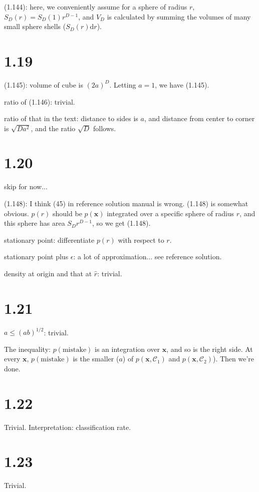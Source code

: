 \documentclass[12pt]{article}
\newcommand{\vect}[1]{\mathbf{#1}}
\begin{document}
(1.144): here, we conveniently assume for a sphere of radius $r$, $S_D(r) =S_D(1) r^{D-1} $, and $V_D$ is calculated by summing the volumes of many small sphere shells ($S_D(r) \mathrm{d}r$).

\section{1.19}
(1.145): volume of cube is $(2a)^D$. Letting $a=1$, we have (1.145).

ratio of (1.146): trivial.

ratio of that in the text: distance to sides is $a$, and distance from center to corner is $\sqrt{D a^2}$, and the ratio $\sqrt{D}$ follows.

\section{1.20}
skip for now...

(1.148): I think (45) in reference solution manual is wrong. (1.148) is somewhat obvious. $p(r)$ should be $p(\vect{x})$ integrated over a specific sphere of radius $r$, and this sphere has area $S_D r^{D-1}$, so we get (1.148).

stationary point: differentiate $p(r)$ with respect to $r$.

stationary point plus $\epsilon$: a lot of approximation... see reference solution.

density at origin and that at $\widehat{r}$: trivial.


\section{1.21}
$a \leq (ab)^{1/2}$: trivial.

The inequality: $p(\mathrm{mistake})$ is an integration over $\vect{x}$, and so is the right side. At every $\vect{x}$, $p(\mathrm{mistake})$ is the smaller ($a$) of $p(\vect{x},\mathcal{C}_1)$ and $p(\vect{x},\mathcal{C}_2)$). Then we're done.

\section{1.22}
Trivial. Interpretation: classification rate.


\section{1.23}
Trivial.
\end{document}
